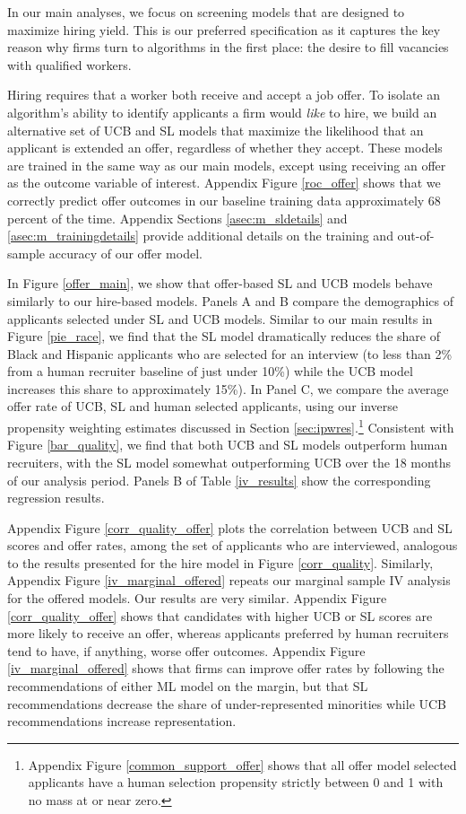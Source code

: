 \documentclass[crop,noquery,editorname,historyrev,nosurname,runningno,sepcount]{RESTUD}
\begin{document}
In our main analyses, we focus on screening models that are designed to maximize hiring yield.  This is our preferred specification as it captures the key reason why firms turn to algorithms in the first place: the desire to fill vacancies with qualified workers.  

Hiring requires that a worker both receive and accept a job offer.  To isolate an algorithm's ability to identify applicants a firm would \textit{like} to hire, we build an alternative set of UCB and SL models that maximize the likelihood that an applicant is extended an offer, regardless of whether they accept.  These models are trained in the same way as our main models, except using receiving an offer as the outcome variable of interest.  Appendix Figure \ref{roc_offer} shows that we correctly predict offer outcomes in our baseline training data approximately 68 percent of the time. Appendix Sections \ref{asec:m_sldetails} and \ref{asec:m_trainingdetails} provide additional details on the training and out-of-sample accuracy of our offer model. 

In Figure \ref{offer_main}, we show that offer-based SL and UCB models behave similarly to our hire-based models.  Panels A and B compare the demographics of applicants selected under SL and UCB models.  Similar to our main results in Figure \ref{pie_race}, we find that the SL model dramatically reduces the share of Black and Hispanic applicants who are selected for an interview (to less than 2\% from a human recruiter baseline of just under 10\%) while the UCB model increases this share to approximately 15\%).   In Panel C, we compare the average offer rate of UCB, SL and human selected applicants, using our inverse propensity weighting estimates discussed in Section \ref{sec:ipwres}.\footnote{Appendix Figure \ref{common_support_offer} shows that all offer model selected applicants have a human selection propensity strictly between 0 and 1 with no mass at or near zero.}  Consistent with Figure \ref{bar_quality}, we find that both UCB and SL models outperform human recruiters, with the SL model somewhat outperforming UCB over the 18 months of our analysis period.  Panels B of Table \ref{iv_results} show the corresponding regression results. 

Appendix Figure \ref{corr_quality_offer} plots the correlation between UCB and SL scores and offer rates, among the set of applicants who are interviewed, analogous to the results presented for the hire model in Figure \ref{corr_quality}.  Similarly, Appendix Figure \ref{iv_marginal_offered} repeats our marginal sample IV analysis for the offered models.  Our results are very similar.  Appendix Figure \ref{corr_quality_offer} shows that candidates with higher UCB or SL scores are more likely to receive an offer, whereas applicants preferred by human recruiters tend to have, if anything, worse offer outcomes. Appendix Figure \ref{iv_marginal_offered} shows that firms can improve offer rates by following the recommendations of either ML model on the margin, but that SL recommendations decrease the share of under-represented minorities while UCB recommendations increase representation.  
\end{document}

